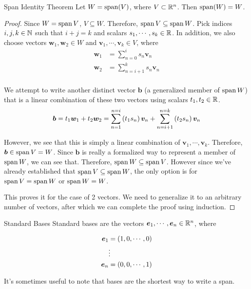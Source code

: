 \documentclass[11pt]{article}
\begin{document}
\begin{theorem}{Span Identity Theorem}
  Let $W = \operatorname{span}(V)$, where $V \subset \mathbb{R}^n$.
  Then $\operatorname{span}(W) = W$.
  \begin{proof}
    Since $W = \operatorname{span} V$, $V \subseteq W$.
    Therefore, $\operatorname{span} V \subseteq \operatorname{span} W$.
    Pick indices $i, j, k \in \mathbb N $ such that $i + j = k$ and scalars $s_1, \cdots, s_k \in \mathbb R$.
    In addition, we also choose vectors $\bm{w}_1, \bm{w}_2 \in W$ and $\bm{v}_1, \cdots, \bm{v}_k \in V$, where
    \begin{align*}
      \bm{w}_1 &= \sum \limits_{n=0}^i s_n \bm{v}_n\\
      \bm{w}_2 &= \sum \limits_{n=i+1}^{k} s_n \bm{v}_n\\
    \end{align*}
    
    We attempt to write another distinct vector $\bm{b}$ (a generalized member of $\operatorname{span} W$) that is a linear combination of these two vectors using scalars $t_1, t_2 \in \mathbb R$.
    $$
    \bm{b} = t_1 \bm{w}_1 + t_2 \bm{w}_2 = \sum \limits_{n=1}^{n=i} \left ( t_1 s_n \right) \bm{v}_n  + \sum \limits_{n=i+1}^{n=k} \left ( t_2 s_n \right) \bm{v}_n
    $$

    However, we see that this is simply a linear combination of $\bm{v}_1, \cdots, \bm{v}_k$.
    Therefore, $\bm{b} \in \operatorname{span} V = W$.
    Since $\bm{b}$ is really a formalized way to represent a member of $\operatorname{span} W$, we can see that. Therefore, $\operatorname{span} W \subseteq \operatorname{span} V$.
    However since we've already established that $\operatorname{span} V \subseteq \operatorname{span} W$, the only option is for $\operatorname{span} V = \operatorname{span} W$ or $\operatorname{span} W = W$.

    This proves it for the case of 2 vectors.
    We need to generalize it to an arbitrary number of vectors, after which we can complete the proof using induction.
  \end{proof}
\end{theorem}





\begin{definition}{Standard Bases}
  Standard bases are the vectors $\bm{e}_1, \cdots, \bm{e}_n \in \mathbb{R}^n$, where

  \begin{align*}
    \bm{e}_1 &= \left ( 1, 0, \cdots, 0 \right) \\
    & \vdots \\
    \bm{e}_n &= \left ( 0, 0, \cdots, 1 \right) \\
  \end{align*}

  It's sometimes useful to note that bases are the shortest way to write a span.
\end{definition}
\end{document}

